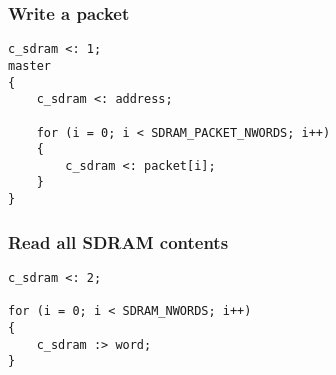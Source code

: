 \subsubsection{Write a packet}

\begin{lstlisting}
c_sdram <: 1;
master
{
	c_sdram <: address;

	for (i = 0; i < SDRAM_PACKET_NWORDS; i++)
	{
		c_sdram <: packet[i];
	}
}
\end{lstlisting}


\subsubsection{Read all SDRAM contents}

\begin{lstlisting}
c_sdram <: 2;

for (i = 0; i < SDRAM_NWORDS; i++)
{
	c_sdram :> word;
}
\end{lstlisting}